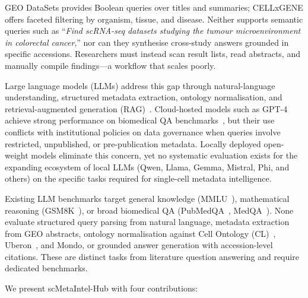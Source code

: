 \documentclass[sn-nature]{sn-jnl}
\begin{document}
GEO DataSets provides Boolean queries over titles and summaries; CELLxGENE
offers faceted filtering by organism, tissue, and disease. Neither supports
semantic queries such as ``\textit{Find scRNA-seq datasets studying the
tumour microenvironment in colorectal cancer},'' nor can they synthesise
cross-study answers grounded in specific accessions. Researchers must
instead scan result lists, read abstracts, and manually compile findings---a
workflow that scales poorly.

Large language models (LLMs) address this gap through natural-language
understanding, structured metadata extraction, ontology normalisation, and
retrieval-augmented generation (RAG)~\cite{lewis2020retrieval}. Cloud-hosted
models such as GPT-4~\cite{openai2023gpt4} achieve strong performance on
biomedical QA benchmarks~\cite{nori2023capabilities}, but their use conflicts
with institutional policies on data governance when queries involve
restricted, unpublished, or pre-publication metadata. Locally deployed
open-weight models eliminate this concern, yet no systematic evaluation
exists for the expanding ecosystem of local LLMs (Qwen, Llama, Gemma,
Mistral, Phi, and others) on the specific tasks required for single-cell
metadata intelligence.

Existing LLM benchmarks target general knowledge (MMLU~\cite{hendrycks2021measuring}),
mathematical reasoning (GSM8K~\cite{cobbe2021training}), or broad biomedical
QA (PubMedQA~\cite{jin2019pubmedqa}, MedQA~\cite{jin2021disease}). None
evaluate structured query parsing from natural language, metadata extraction
from GEO abstracts, ontology normalisation against Cell Ontology
(CL)~\cite{diehl2016cell}, Uberon~\cite{mungall2012uberon}, and Mondo, or
grounded answer generation with accession-level citations. These are distinct
tasks from literature question answering and require dedicated benchmarks.

We present scMetaIntel-Hub with four contributions:
\end{document}
